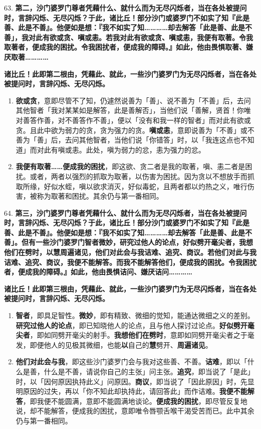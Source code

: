 {\Large 63.} \textbf{第二，沙门婆罗门尊者凭藉什么、就什么而为无尽闪烁者，当在各处被提问时，言辞闪烁、无尽闪烁？于此，诸比丘！部分沙门或婆罗门不如实了知『此是善、此是不善』。他便如是想：『我不如实了知…………却去解答「此是善、此是不善」，我对此有欲或贪、嗔或恚。若我对此有欲或贪、嗔或恚，我便有取著。令我取著者，便成我的困扰。令我困扰者，便成我的障碍。』如此，他由畏惧取著、嫌厌取著…………}

\textbf{诸比丘！此即第二根由，凭藉此、就此，一些沙门婆罗门为无尽闪烁者，当在各处被提问时，言辞闪烁、无尽闪烁。}

\begin{enumerate}\item \textbf{欲或贪}，意即尽管不了知，仍遽然说善为「善」、说不善为「不善」后，去问其他智者「我对某某如是解答，此是善解否」，当他们说「善解，贤首！你唯对善答作善，对不善答作不善」，便以「没有和我一样的智者」而对此有欲或贪。且此中欲为弱力的贪，贪为强力的贪。\textbf{嗔或恚}，意即说善为「不善」或不善为「善」后，去问其他智者，当他们说「你错答」时，以「我连这点也不知道」而对此有嗔或恚。此处，嗔为弱力的忿，恚为强力的忿。
\item \textbf{我便有取著……便成我的困扰}，即这欲、贪二者是我的取著，嗔、恚二者是困扰。或者，两者以强烈的抓取为取著，以伤害为困扰。因为贪以不想放手而抓取所缘，好似水蛭，嗔以欲求消灭，好似毒蛇，且两者都以灼热之义，唯行伤害，被称为取著和困扰。其余仍与第一番相同。\end{enumerate}

{\Large 64.} \textbf{第三，沙门婆罗门尊者凭藉什么、就什么而为无尽闪烁者，当在各处被提问时，言辞闪烁、无尽闪烁？于此，诸比丘！部分沙门或婆罗门不如实了知『此是善、此是不善』。他便如是想：『我不如实了知…………却去解答「此是善、此是不善」。但有一些沙门婆罗门智者微妙，研究过他人的论点，好似劈开毫尖者，我想他们在劈时，以慧周遍诸见，他们对此会与我诘难、追究、商议。若他们对此与我诘难、追究、商议，我便不能解答。而我不能解答他们，便成我的困扰。令我困扰者，便成我的障碍。』如此，他由畏惧诘问、嫌厌诘问…………}

\textbf{诸比丘！此即第三根由，凭藉此、就此，一些沙门婆罗门为无尽闪烁者，当在各处被提问时，言辞闪烁、无尽闪烁。}

\begin{enumerate}\item \textbf{智者}，即具足智性。\textbf{微妙}，即有精致、微细的觉知，能通达微细之义的差别。\textbf{研究过他人的论点}，即已知晓他人的论点，且与他人探讨过论点。\textbf{好似劈开毫尖者}，即如同劈开毫尖的射手。\textbf{我想他们在劈时}，意即如同劈开毫尖者之于毫发，即便他人的见极其微细，也能\textbf{以}自己的\textbf{慧}劈开、\textbf{周遍诸见}。
\item \textbf{他们对此会与我}，即这些沙门婆罗门会与我对这些善、不善。\textbf{诘难}，即以「什么是善，什么是不善，请说你自己的主张」问主张。\textbf{追究}，即当说了「是此」时，以「因何原因执持此义」问原因。\textbf{商议}，即当说了「因此原因」时，先显明原因的过失，再以「你不知此却执持此，请回答此」而作诘难。\textbf{我便不能解答}，即我便不能圆满，意即不能圆满地谈论。\textbf{便成我的困扰}，即尽管反复地说，却不能解答，便成我的困扰，意即唯令唇颚舌喉干渴受苦而已。此中其余仍与第一番相同。\end{enumerate}

